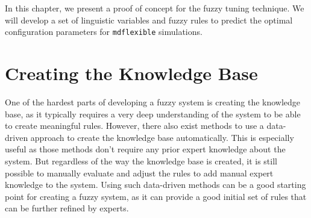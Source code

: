 \newcommand{\crispTreeNode}[2]{
    \begin{tikzpicture}
        \begin{axis}%
            [
                title = {Crisp Split: $#1 \leq #2$},
                width=4.5cm,
                height=3cm,
                axis lines=center,
                xlabel={#1},
                x label style={at={(axis description cs:0.9,-0.1)},anchor=north},
                ylabel=$\mu$,
                y label style={at={(axis description cs:0.5,1)},anchor=south},
                xmin=-5,
                xmax=5,
                xtick={},
                xticklabels= {},
                ytick={},
                yticklabels={},
                extra x ticks={0},
                extra x tick labels={#2},
                ymin=-0.1,
                ymax=1.1,
                samples=50,
                extra y ticks={1},
                every axis plot/.append style={thick}
            ]
            \addplot[red,domain=-5:-0.6] {step(x,0,-1)};
            \addplot[blue,domain=0.6:5] {step(x,0,1)};
            \addplot[red,domain=0.6:5] {step(x,0,-1)};
            \addplot[blue,domain=-5:-0.6] {step(x,0,1)};

            \node[draw,draw=black,circle,inner sep=1pt,minimum width=3pt,thick] at (axis cs:0,1) {};
            \node[draw,draw=black,circle,inner sep=1pt,minimum width=3pt,thick] at (axis cs:0,0) {};

            \node[anchor=center, red] at (axis cs:-2.9,0.6) {$#1 \leq #2$};
            \node[anchor=center, blue] at (axis cs:3.1,0.6) {$#1 > #2$};
        \end{axis}

    \end{tikzpicture}
}



In this chapter, we present a proof of concept for the fuzzy tuning technique. We will develop a set of linguistic variables and fuzzy rules to predict the optimal configuration parameters for \texttt{\gls{mdflexible}} simulations.

\section{Creating the Knowledge Base}

One of the hardest parts of developing a fuzzy system is creating the knowledge base, as it typically requires a very deep understanding of the system to be able to create meaningful rules. However, there also exist methods to use a data-driven approach to create the knowledge base automatically. This is especially useful as those methods don't require any prior expert knowledge about the system. But regardless of the way the knowledge base is created, it is still possible to manually evaluate and adjust the rules to add manual expert knowledge to the system. Using such data-driven methods can be a good starting point for creating a fuzzy system, as it can provide a good initial set of rules that can be further refined by experts.

